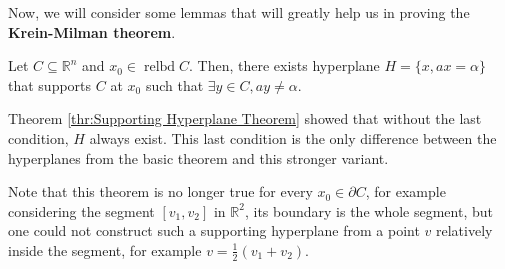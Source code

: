 Now, we will consider some lemmas that will greatly help us in proving the
\textbf{Krein-Milman theorem}.

  \begin{lemma}
  \label{lem:Supporting Hyperplane Theorem (Stronger variant)}

  Let \( C \subseteq \mathbb{R}^{n} \) and \( x_{0} \in \operatorname{relbd} C \).
  Then, there exists hyperplane \( H = \{x, ax = \alpha\}   \) that supports \(
  C\) at \( x_{0} \) such that \( \exists y \in C, ay \neq  \alpha \).
  \end{lemma}

  Theorem \ref{thr:Supporting Hyperplane Theorem} showed that without the last
  condition, \( H \) always exist. This last condition is the only difference
  between the hyperplanes from the basic theorem and this stronger variant.

  Note that this theorem is no longer true for every \( x_{0} \in \partial C \),
  for example considering the segment \( [v_{1}, v_{2}] \) in \( \mathbb{R}^2
  \), its boundary is the whole segment, but one could not construct such a
  supporting hyperplane from a point \( v \) relatively inside the segment, for
  example \( v = \frac{1}{2}(v_{1} + v_{2}) \).

